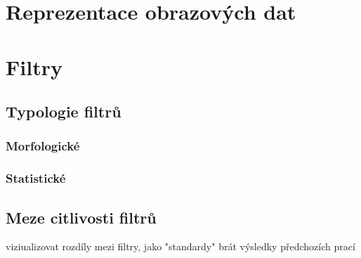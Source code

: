 \section{Reprezentace obrazových dat}


\section{Filtry}\label{Filtry}
    \subsection{Typologie filtrů}       %
        \subsubsection{Morfologické}
        \subsubsection{Statistické}
    \subsection{Meze citlivosti filtrů}




viziualizovat rozdíly mezi filtry, jako "standardy" brát výsledky předchozích prací 